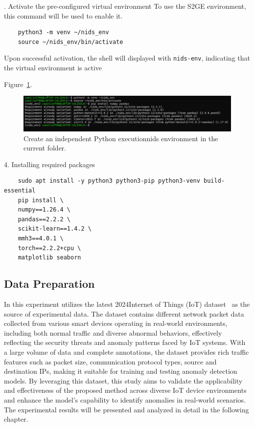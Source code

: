 \begin{ZhChapter}
    . Activate the pre-configured virtual environment
    To use the S2GE environment, this command will be used to enable it.
    \begin{verbatim}
    python3 -m venv ~/nids_env
    source ~/nids_env/bin/activate
    \end{verbatim}




    Upon successful activation, the shell will displayed with \texttt{nids-env}, indicating that the virtual environment is active



    Figure~\ref{fig:Nids}.

    \begin{figure}[htbp]
        \centering
        \includegraphics[width = 1\textwidth]{image/Nids-env.jpg}
        \caption{Create an independent Python executionnids environment in the current folder.}
        \label{fig:Nids}
    \end{figure}




    4. Installing required packages
    \begin{verbatim}
    sudo apt install -y python3 python3-pip python3-venv build-essential
    pip install \
    numpy==1.26.4 \
    pandas==2.2.2 \
    scikit-learn==1.4.2 \
    mmh3==4.0.1 \
    torch==2.2.2+cpu \
    matplotlib seaborn

    \end{verbatim}






    \subsection{Data Preparation}
    In this experiment utilizes the latest 2024Internet of Things (IoT) dataset~\cite{ciciot2024} as the source of experimental data. The dataset contains different network packet data collected from various smart devices operating in real-world environments, including both normal traffic and diverse abnormal behaviors, effectively reflecting the security threats and anomaly patterns faced by IoT systems. With a large volume of data and complete annotations, the dataset provides rich traffic features such as packet size, communication protocol types, source and destination IPs, making it suitable for training and testing anomaly detection models. By leveraging this dataset, this study aims to validate the applicability and effectiveness of the proposed method across diverse IoT device environments and enhance the model's capability to identify anomalies in real-world scenarios. The experimental results will be presented and analyzed in detail in the following chapter.




\end{ZhChapter}
